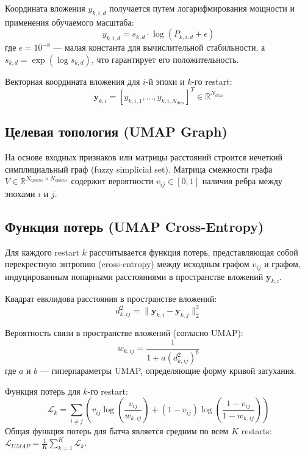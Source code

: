 \documentclass[a4paper,12pt]{article}
\begin{document}
Координата вложения $y_{k,i,d}$ получается путем логарифмирования мощности и применения обучаемого масштаба:
\begin{equation}
    y_{k,i,d} = s_{k,d} \cdot \log(P_{k,i,d} + \epsilon)
\end{equation}
где $\epsilon = 10^{-8}$ --- малая константа для вычислительной стабильности, а $s_{k,d} = \exp(\log s_{k,d})$, что гарантирует его положительность.

Векторная координата вложения для $i$-й эпохи и $k$-го restart:
\begin{equation}
    \mathbf{y}_{k,i} = [y_{k,i,1}, \dots, y_{k,i,N_{dim}}]^T \in \mathbb{R}^{N_{dim}}
\end{equation}

\subsection{Целевая топология (UMAP Graph)}
На основе входных признаков или матрицы расстояний строится нечеткий симплициальный граф (fuzzy simplicial set). Матрица смежности графа $V \in \mathbb{R}^{N_{epochs} \times N_{epochs}}$ содержит вероятности $v_{ij} \in [0, 1]$ наличия ребра между эпохами $i$ и $j$.

\subsection{Функция потерь (UMAP Cross-Entropy)}
Для каждого restart $k$ рассчитывается функция потерь, представляющая собой перекрестную энтропию (cross-entropy) между исходным графом $v_{ij}$ и графом, индуцированным попарными расстояниями в пространстве вложений $\mathbf{y}_{k,i}$.

Квадрат евклидова расстояния в пространстве вложений:
\begin{equation}
    d_{k,ij}^2 = \|\mathbf{y}_{k,i} - \mathbf{y}_{k,j}\|_2^2
\end{equation}

Вероятность связи в пространстве вложений (согласно UMAP):
\begin{equation}
    w_{k,ij} = \frac{1}{1 + a (d_{k,ij}^2)^b}
\end{equation}
где $a$ и $b$ --- гиперпараметры UMAP, определяющие форму кривой затухания.

Функция потерь для $k$-го restart:
\begin{equation}
    \mathcal{L}_k = \sum_{i \neq j} \left( v_{ij} \log \left( \frac{v_{ij}}{w_{k,ij}} \right) + (1 - v_{ij}) \log \left( \frac{1 - v_{ij}}{1 - w_{k,ij}} \right) \right)
\end{equation}
Общая функция потерь для батча является средним по всем $K$ restarts: $\mathcal{L}_{UMAP} = \frac{1}{K} \sum_{k=1}^K \mathcal{L}_k$.
\end{document}
